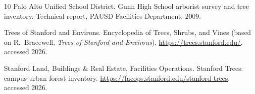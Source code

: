 \documentclass[11pt]{article}
\begin{document}
\begin{thebibliography}{10}
Palo Alto Unified School District.
\newblock Gunn High School arborist survey and tree inventory.
\newblock Technical report, PAUSD Facilities Department, 2009.

Trees of Stanford and Environs.
\newblock Encyclopedia of Trees, Shrubs, and Vines (based on R.~Bracewell, \emph{Trees of Stanford and Environs}).
\newblock \url{https://trees.stanford.edu/}, accessed 2026.

Stanford Land, Buildings \& Real Estate, Facilities Operations.
\newblock Stanford Trees: campus urban forest inventory.
\newblock \url{https://facops.stanford.edu/stanford-trees}, accessed 2026.

\end{thebibliography}
\end{document}
